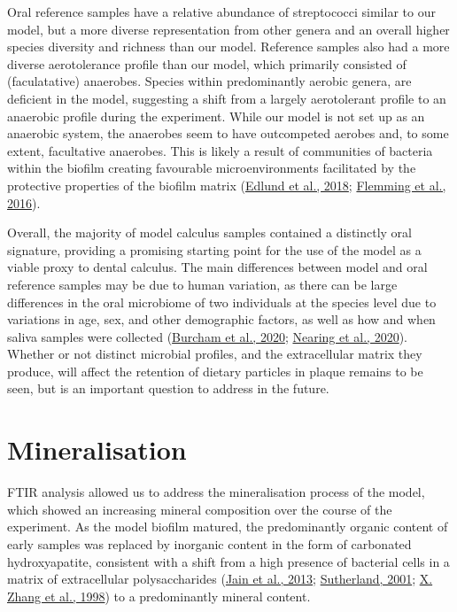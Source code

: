\documentclass[
  letterpaper,
]{book}
\begin{document}
Oral reference samples have a relative abundance of streptococci similar
to our model, but a more diverse representation from other genera and an
overall higher species diversity and richness than our model. Reference
samples also had a more diverse aerotolerance profile than our model,
which primarily consisted of (faculatative) anaerobes. Species within
predominantly aerobic genera, are deficient in the model, suggesting a
shift from a largely aerotolerant profile to an anaerobic profile during
the experiment. While our model is not set up as an anaerobic system,
the anaerobes seem to have outcompeted aerobes and, to some extent,
facultative anaerobes. This is likely a result of communities of
bacteria within the biofilm creating favourable microenvironments
facilitated by the protective properties of the biofilm matrix
(\protect\hyperlink{ref-edlundUncoveringComplex2018}{Edlund et al.,
2018}; \protect\hyperlink{ref-flemmingBiofilmsEmergent2016}{Flemming et
al., 2016}).

Overall, the majority of model calculus samples contained a distinctly
oral signature, providing a promising starting point for the use of the
model as a viable proxy to dental calculus. The main differences between
model and oral reference samples may be due to human variation, as there
can be large differences in the oral microbiome of two individuals at
the species level due to variations in age, sex, and other demographic
factors, as well as how and when saliva samples were collected
(\protect\hyperlink{ref-burchamPatternsOral2020}{Burcham et al., 2020};
\protect\hyperlink{ref-nearingAssessingVariation2020}{Nearing et al.,
2020}). Whether or not distinct microbial profiles, and the
extracellular matrix they produce, will affect the retention of dietary
particles in plaque remains to be seen, but is an important question to
address in the future.

\hypertarget{mineralisation}{%
\section{Mineralisation}\label{mineralisation}}

FTIR analysis allowed us to address the mineralisation process of the
model, which showed an increasing mineral composition over the course of
the experiment. As the model biofilm matured, the predominantly organic
content of early samples was replaced by inorganic content in the form
of carbonated hydroxyapatite, consistent with a shift from a high
presence of bacterial cells in a matrix of extracellular polysaccharides
(\protect\hyperlink{ref-jainIsolationCharacterization2013}{Jain et al.,
2013}; \protect\hyperlink{ref-sutherlandBiofilmMatrix2001}{Sutherland,
2001}; \protect\hyperlink{ref-zhangMeasurementPolysaccharides1998}{X.
Zhang et al., 1998}) to a predominantly mineral content.
\end{document}
